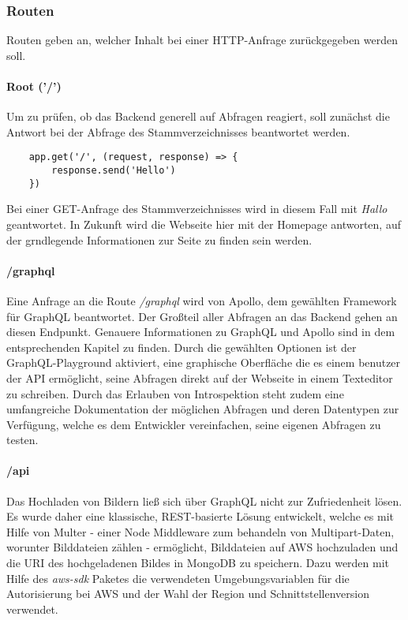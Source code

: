 \subsubsection{Routen}
Routen geben an, welcher Inhalt bei einer HTTP-Anfrage zurückgegeben werden soll.

\paragraph{Root ('/')\\}
Um zu prüfen, ob das Backend generell auf Abfragen reagiert, soll zunächst die Antwort bei der Abfrage des Stammverzeichnisses beantwortet werden.
\begin{lstlisting}
    app.get('/', (request, response) => {
        response.send('Hello')
    })
\end{lstlisting}
Bei einer GET-Anfrage des Stammverzeichnisses wird in diesem Fall mit \textit{\glqq Hallo \grqq} geantwortet. In Zukunft wird die Webseite hier mit der Homepage antworten, auf der grndlegende Informationen zur Seite zu finden sein werden.

\paragraph{/graphql\\}
Eine Anfrage an die Route \textit{/graphql} wird von Apollo, dem gewählten Framework für GraphQL beantwortet. Der Großteil aller Abfragen an das Backend gehen an diesen Endpunkt. Genauere Informationen zu GraphQL und Apollo sind in dem entsprechenden Kapitel zu finden. Durch die gewählten Optionen ist der GraphQL-Playground aktiviert, eine graphische Oberfläche die es einem benutzer der API ermöglicht, seine Abfragen direkt auf der Webseite in einem Texteditor zu schreiben. Durch das Erlauben von Introspektion steht zudem eine umfangreiche Dokumentation der möglichen Abfragen und deren Datentypen zur Verfügung, welche es dem Entwickler vereinfachen, seine eigenen Abfragen zu testen.


\paragraph{/api\\}
Das Hochladen von Bildern ließ sich über GraphQL nicht zur Zufriedenheit lösen. Es wurde daher eine klassische, REST-basierte Lösung entwickelt, welche es mit Hilfe von Multer - einer Node Middleware zum behandeln von Multipart-Daten, worunter Bilddateien zählen - ermöglicht, Bilddateien auf AWS hochzuladen und die URI des hochgeladenen Bildes in MongoDB zu speichern. Dazu werden mit Hilfe des \textit{aws-sdk} Paketes die verwendeten Umgebungsvariablen für die Autorisierung bei AWS und der Wahl der Region und Schnittstellenversion verwendet. 

